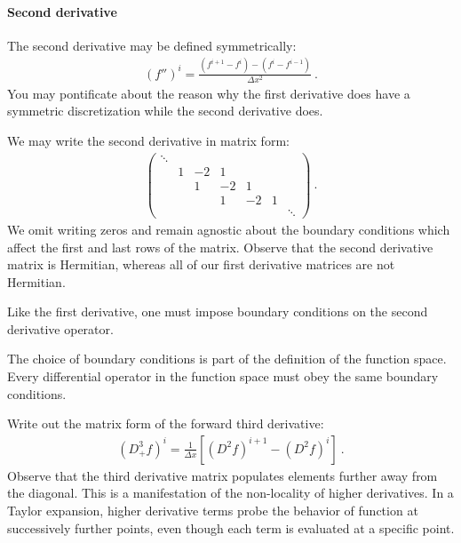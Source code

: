 \documentclass[12pt, oneside]{report}    %
\begin{document}
\paragraph{Second derivative}
The second derivative may be defined symmetrically:
\begin{align}
  (f'')^i = \frac{(f^{i+1} - f^i) - (f^i - f^{i-1})}{\Delta x^2} \ .
\end{align}
You may pontificate about the reason why the first derivative does have a symmetric discretization while the second derivative does. 
\begin{example}
We may write the second derivative in matrix form:
\begin{align}
    \begin{pmatrix}
        \ddots & & & & 
        \\
        & 1 & -2 & 1 &  & 
        \\
        &  & 1 & -2 & 1 &  \\
        &  &  & 1 & -2 & 1 \\
        & & & & &  &\ddots
    \end{pmatrix} \ .
    \label{eq:second:derivative:matrix}
\end{align}
We omit writing zeros and remain agnostic about the boundary conditions which affect the first and last rows of the matrix. Observe that the second derivative matrix is Hermitian, whereas all of our first derivative matrices are not Hermitian.
\end{example}
Like the first derivative, one must impose boundary conditions on the second derivative operator. 

\begin{bigidea}
The choice of boundary conditions is part of the definition of the function space. Every differential operator in the function space must obey the same boundary conditions. 
\end{bigidea}

\begin{exercise}
Write out the matrix form of the forward third derivative:
\begin{align}
    \left(D_+^3 f\right)^i = \frac{1}{\Delta x}\left[(D^2 f)^{i+1}-(D^2f)^i\right] \ .
\end{align}
Observe that the third derivative matrix populates elements further away from the diagonal. This is a manifestation of the non-locality of higher derivatives. In a Taylor expansion, higher derivative terms probe the behavior of function at successively further points, even though each term is evaluated at a specific point.
\end{exercise}
\end{document}
